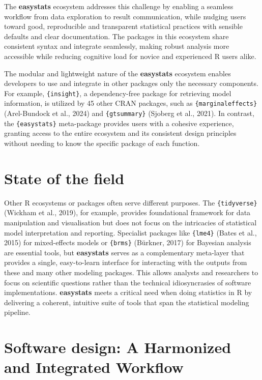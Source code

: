 \documentclass{article}
\begin{document}
The \textbf{easystats} ecosystem addresses this challenge by enabling a
seamless workflow from data exploration to result communication, while
nudging users toward good, reproducible and transparent statistical
practices with sensible defaults and clear documentation. The packages
in this ecosystem share consistent syntax and integrate seamlessly,
making robust analysis more accessible while reducing cognitive load for
novice and experienced R users alike.

The modular and lightweight nature of the \textbf{easystats} ecosystem
enables developers to use and integrate in other packages only the
necessary components. For example, \texttt{\{insight\}}, a
dependency-free package for retrieving model information, is utilized by
45 other CRAN packages, such as \texttt{\{marginaleffects\}}
(Arel-Bundock et al., 2024) and \texttt{\{gtsummary\}} (Sjoberg et al.,
2021). In contrast, the \texttt{\{easystats\}} meta-package provides
users with a cohesive experience, granting access to the entire
ecosystem and its consistent design principles without needing to know
the specific package of each function.

\section{State of the field}\label{state-of-the-field}

Other R ecosystems or packages often serve different purposes. The
\texttt{\{tidyverse\}} (Wickham et al., 2019), for example, provides
foundational framework for data manipulation and visualisation but does
not focus on the intricacies of statistical model interpretation and
reporting. Specialist packages like \texttt{\{lme4\}} (Bates et al.,
2015) for mixed-effects models or \texttt{\{brms\}} (Bürkner, 2017) for
Bayesian analysis are essential tools, but \textbf{easystats} serves as
a complementary meta-layer that provides a single, easy-to-learn
interface for interacting with the outputs from these and many other
modeling packages. This allows analysts and researchers to focus on
scientific questions rather than the technical idiosyncrasies of
software implementations. \textbf{easystats} meets a critical need when
doing statistics in R by delivering a coherent, intuitive suite of tools
that span the statistical modeling pipeline.

\section{Software design: A Harmonized and Integrated
Workflow}\label{software-design-a-harmonized-and-integrated-workflow}
\end{document}

